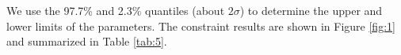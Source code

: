 \documentclass[twocolumn]{aastex631}
\begin{document}
   We use the 97.7\% and 2.3\% quantiles (about $2\sigma$) to determine the upper and lower
   limits of the parameters. The  constraint results are shown in 
   Figure \ref{fig:1} and summarized in Table \ref{tab:5}.

   \begin{figure}
      \centering
\end{figure}
\end{document}

